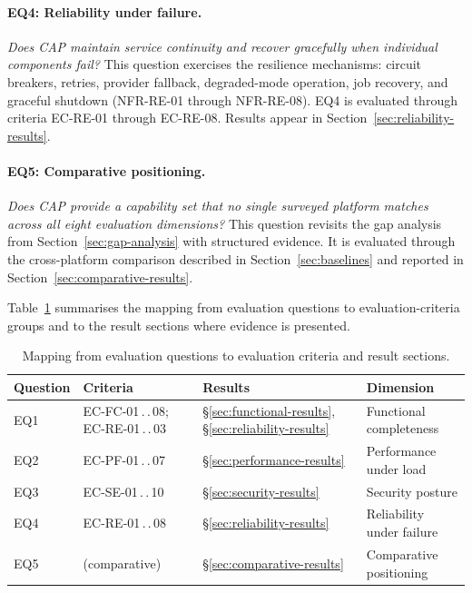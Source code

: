\documentclass[a4paper]{sapthesis}
\begin{document}
\paragraph{EQ4: Reliability under failure.}
\emph{Does CAP maintain service continuity and recover gracefully when
individual components fail?}
This question exercises the resilience mechanisms: circuit breakers,
retries, provider fallback, degraded-mode operation, job recovery, and
graceful shutdown (NFR-RE-01 through NFR-RE-08).  EQ4 is evaluated
through criteria EC-RE-01 through EC-RE-08.  Results appear in
Section~\ref{sec:reliability-results}.

\paragraph{EQ5: Comparative positioning.}
\emph{Does CAP provide a capability set that no single surveyed platform
matches across all eight evaluation dimensions?}
This question revisits the gap analysis from Section~\ref{sec:gap-analysis}
with structured evidence.  It is evaluated through the cross-platform
comparison described in Section~\ref{sec:baselines} and reported in
Section~\ref{sec:comparative-results}.

\medskip

Table~\ref{tab:eq-mapping} summarises the mapping from evaluation
questions to evaluation-criteria groups and to the result sections where
evidence is presented.

\begin{table}[ht]
\centering
\caption{Mapping from evaluation questions to evaluation criteria and
result sections.}
\label{tab:eq-mapping}
\small
\begin{tabularx}{\textwidth}{@{}l l l X@{}}
    \hline
    \textbf{Question} & \textbf{Criteria} & \textbf{Results} &
        \textbf{Dimension} \\
    \hline
    EQ1 & EC-FC-01\,.\,.\,08; EC-RE-01\,.\,.\,03 &
        \S\ref{sec:functional-results}, \S\ref{sec:reliability-results} &
        Functional completeness \\
    EQ2 & EC-PF-01\,.\,.\,07 &
        \S\ref{sec:performance-results} &
        Performance under load \\
    EQ3 & EC-SE-01\,.\,.\,10 &
        \S\ref{sec:security-results} &
        Security posture \\
    EQ4 & EC-RE-01\,.\,.\,08 &
        \S\ref{sec:reliability-results} &
        Reliability under failure \\
    EQ5 & (comparative) &
        \S\ref{sec:comparative-results} &
        Comparative positioning \\
    \hline
\end{tabularx}
\end{table}
\end{document}
